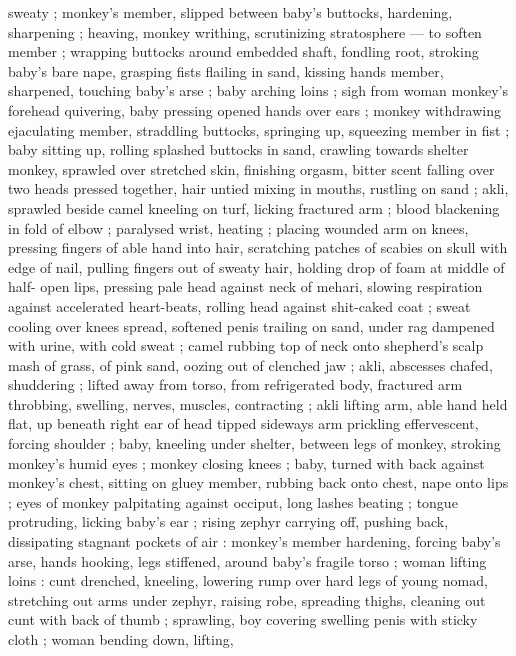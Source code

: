 sweaty ; monkey's member, slipped between baby's buttocks, 
hardening, sharpening ; heaving, monkey writhing, scrutinizing 
stratosphere --- to soften member ; wrapping buttocks around 
embedded shaft, fondling root, stroking baby's bare nape, grasping 
fists flailing in sand, kissing hands {\col} member, sharpened, touching 
baby's arse ; baby arching loins ; sigh from woman {\col} monkey's 
forehead quivering, baby pressing opened hands over ears ; monkey 
withdrawing ejaculating member, straddling buttocks, springing up, 
squeezing member in fist ; baby sitting up, rolling splashed buttocks 
in sand, crawling towards shelter {\col} monkey, sprawled over stretched 
skin, finishing orgasm, bitter scent falling over two heads pressed 
together, hair untied mixing in mouths, rustling on sand ; akli, 
sprawled beside camel kneeling on turf, licking fractured arm ; blood 
blackening in fold of elbow ; paralysed wrist, heating ; placing 
wounded arm on knees, pressing fingers of able hand into hair, 
scratching patches of scabies on skull with edge of nail, pulling 
fingers out of sweaty hair, holding drop of foam at middle of half- 
open lips, pressing pale head against neck of mehari, slowing 
respiration against accelerated heart-beats, rolling head against 
shit-caked coat ; sweat cooling over knees spread, softened penis 
trailing on sand, under rag dampened with urine, with cold sweat ; 
camel rubbing top of neck onto shepherd's scalp {\col} mash of grass, of 
pink sand, oozing out of clenched jaw ; akli, abscesses chafed, 
shuddering ; lifted away from torso, from refrigerated body, fractured 
arm throbbing, swelling, nerves, muscles, contracting ; akli lifting 
arm, able hand held flat, up beneath right ear of head tipped 
sideways {\col} arm prickling effervescent, forcing shoulder ; baby, 
kneeling under shelter, between legs of monkey, stroking monkey's 
humid eyes ; monkey closing knees ; baby, turned with back against 
monkey's chest, sitting on gluey member, rubbing back onto chest, 
nape onto lips ; eyes of monkey palpitating against occiput, long 
lashes beating ; tongue protruding, licking baby's ear ; rising zephyr 
carrying off, pushing back, dissipating stagnant pockets of air : 
monkey's member hardening, forcing baby's arse, hands hooking, 
legs stiffened, around baby's fragile torso ; woman lifting loins : cunt 
drenched, kneeling, lowering rump over hard legs of young nomad, 
stretching out arms under zephyr, raising robe, spreading thighs, 
cleaning out cunt with back of thumb ; sprawling, boy covering 
swelling penis with sticky cloth ; woman bending down, lifting, 
